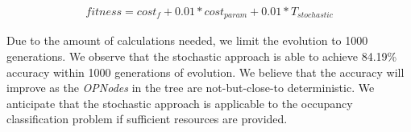 \begin{align}
fitness = cost_f + 0.01*cost_{param} + 0.01*T_{stochastic}
\end{align}

Due to the amount of calculations needed, we limit the evolution to 1000 generations. We observe that the stochastic approach is able to achieve 84.19\% accuracy within 1000 generations of evolution. We believe that the accuracy will improve as the \emph{OPNodes} in the tree are not-but-close-to deterministic. We anticipate that the stochastic approach is applicable to the occupancy classification problem if sufficient resources are provided. 
%

